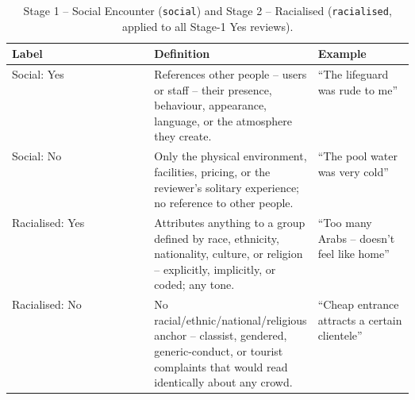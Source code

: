 \begin{table}[htbp]
\centering
\footnotesize
\setlength{\tabcolsep}{3pt}
\caption{Stage 1 -- Social Encounter (\texttt{social}) and Stage 2 -- Racialised (\texttt{racialised}, applied to all Stage-1 Yes reviews).}
\label{tab:codebook-social-racialised}
\begin{tabular}{@{} l p{0.35\linewidth} p{0.24\linewidth} @{}}
\toprule
Label & Definition & Example \\
\midrule
Social: Yes & References other people -- users or staff -- their presence, behaviour, appearance, language, or the atmosphere they create. & ``The lifeguard was rude to me'' \\
\addlinespace
Social: No & Only the physical environment, facilities, pricing, or the reviewer's solitary experience; no reference to other people. & ``The pool water was very cold'' \\
\midrule
Racialised: Yes & Attributes anything to a group defined by race, ethnicity, nationality, culture, or religion -- explicitly, implicitly, or coded; any tone. & ``Too many Arabs -- doesn't feel like home'' \\
\addlinespace
Racialised: No & No racial/ethnic/national/religious anchor -- classist, gendered, generic-conduct, or tourist complaints that would read identically about any crowd. & ``Cheap entrance attracts a certain clientele'' \\
\bottomrule
\end{tabular}
\end{table}

